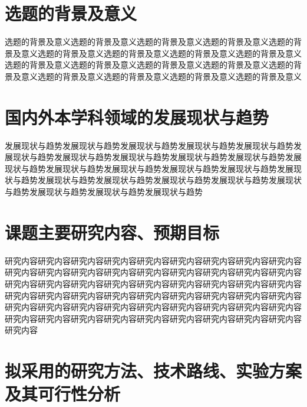 \section{选题的背景及意义}
选题的背景及意义选题的背景及意义选题的背景及意义选题的背景及意义选题的背景及意义选题的背景及意义选题的背景及意义选题的背景及意义选题的背景及意义选题的背景及意义选题的背景及意义选题的背景及意义选题的背景及意义选题的背景及意义选题的背景及意义选题的背景及意义选题的背景及意义选题的背景及意义



\clearpage
\section{国内外本学科领域的发展现状与趋势}
发展现状与趋势发展现状与趋势发展现状与趋势发展现状与趋势发展现状与趋势发展现状与趋势发展现状与趋势发展现状与趋势发展现状与趋势发展现状与趋势发展现状与趋势发展现状与趋势发展现状与趋势发展现状与趋势发展现状与趋势发展现状与趋势发展现状与趋势发展现状与趋势发展现状与趋势发展现状与趋势发展现状与趋势发展现状与趋势发展现状与趋势发展现状与趋势


\clearpage
\section{课题主要研究内容、预期目标}
研究内容研究内容研究内容研究内容研究内容研究内容研究内容研究内容研究内容研究内容研究内容研究内容研究内容研究内容研究内容研究内容研究内容研究内容研究内容研究内容研究内容研究内容研究内容研究内容研究内容研究内容研究内容研究内容研究内容研究内容研究内容研究内容研究内容研究内容研究内容研究内容研究内容研究内容研究内容研究内容研究内容研究内容研究内容研究内容研究内容研究内容研究内容研究内容研究内容研究内容研究内容研究内容研究内容研究内容研究内容

\clearpage
\section{拟采用的研究方法、技术路线、实验方案及其可行性分析}

